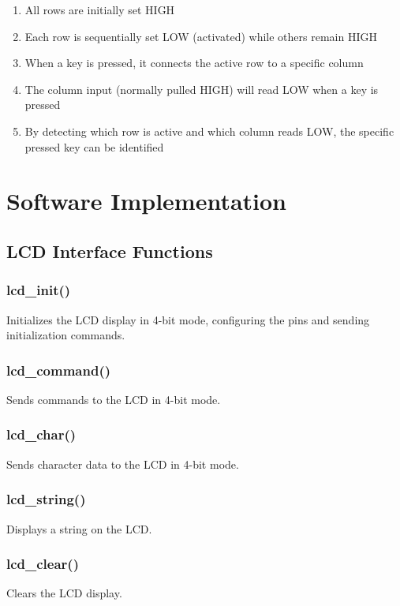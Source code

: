\documentclass[12pt]{article}
\begin{document}
\begin{enumerate}
\item All rows are initially set HIGH
\item Each row is sequentially set LOW (activated) while others remain HIGH
\item When a key is pressed, it connects the active row to a specific column
\item The column input (normally pulled HIGH) will read LOW when a key is pressed
\item By detecting which row is active and which column reads LOW, the specific pressed key can be identified
\end{enumerate}

\section{Software Implementation}

\subsection*{LCD Interface Functions}

\subsubsection*{lcd\_init()}
Initializes the LCD display in 4-bit mode, configuring the pins and sending initialization commands.

\subsubsection*{lcd\_command()}
Sends commands to the LCD in 4-bit mode.

\subsubsection*{lcd\_char()}
Sends character data to the LCD in 4-bit mode.

\subsubsection*{lcd\_string()}
Displays a string on the LCD.

\subsubsection*{lcd\_clear()}
Clears the LCD display.
\end{document}
